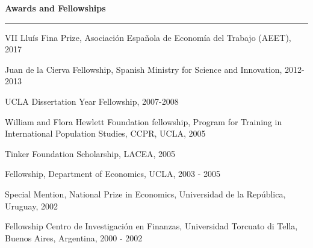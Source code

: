 \documentclass[12pt]{article}
\newlength{\spacebox}
\newcommand{\sepspace}{\vspace*{1em}}		%
\newcommand{\NewPart}[1]{ \vspace*{0.4cm} \noindent \large \textbf{#1}
\par \normalsize \normalfont \vspace*{-0.5cm} \noindent\rule{\textwidth}{1.8pt} \vspace*{-0.75cm} }
\newcommand{\PersonalEntry}[2]{
		\noindent\hangindent=0em\hangafter=0 %
		\parbox{\spacebox}{        %
		\textit{#1}}		       %
		\hspace{1.5em} #2 \par}    %
\newcommand{\SkillsEntry}[2]{      %
		\noindent\hangindent=2em\hangafter=0 %
		\parbox{\spacebox}{        %
		\textit{#1}}			   %
		\hspace{1.5em} #2 \par}    %
\newcommand{\ConferenceEntry}[2]{
		\noindent
		#1		   %
		\hspace{0em} #2 \par}     %
\begin{document}
\NewPart{Awards and Fellowships}{}

\ConferenceEntry{VII Lluís Fina Prize, Asociación Española de Economía del Trabajo (AEET), 2017}

\ConferenceEntry{Juan de la Cierva Fellowship, Spanish Ministry for Science and Innovation, 2012-2013}

\ConferenceEntry{UCLA Dissertation Year Fellowship, 2007-2008}{}{}

\ConferenceEntry{William and Flora Hewlett Foundation fellowship, Program for Training in International Population Studies, CCPR, UCLA, 2005}{}{}

\ConferenceEntry{Tinker Foundation Scholarship, LACEA, 2005}{}{}

\ConferenceEntry{Fellowship, Department of Economics, UCLA, 2003 - 2005}{}{}

\ConferenceEntry{Special Mention, National Prize in Economics, Universidad de la República, Uruguay, 2002}{}{}

\ConferenceEntry{Fellowship Centro de Investigación en Finanzas, Universidad Torcuato di Tella, Buenos Aires, Argentina, 2000 - 2002}{}{}


%
%
%
%
%
%
%
%
%



\end{document}
